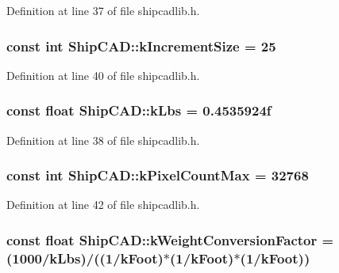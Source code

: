 Definition at line 37 of file shipcadlib.\-h.

\hypertarget{namespaceShipCAD_a1c0de7dc4306d7908bd8c6f7ff69ecdc}{
\subsubsection[{k\-Increment\-Size}]{\setlength{\rightskip}{0pt plus 5cm}const int Ship\-C\-A\-D\-::k\-Increment\-Size = 25}}\label{namespaceShipCAD_a1c0de7dc4306d7908bd8c6f7ff69ecdc}


Definition at line 40 of file shipcadlib.\-h.

\hypertarget{namespaceShipCAD_ad6937518d9742e268b279000d1e7a509}{
\subsubsection[{k\-Lbs}]{\setlength{\rightskip}{0pt plus 5cm}const float Ship\-C\-A\-D\-::k\-Lbs = 0.\-4535924f}}\label{namespaceShipCAD_ad6937518d9742e268b279000d1e7a509}


Definition at line 38 of file shipcadlib.\-h.

\hypertarget{namespaceShipCAD_ac8176e9d12f859826fb131b7febb8c8a}{
\subsubsection[{k\-Pixel\-Count\-Max}]{\setlength{\rightskip}{0pt plus 5cm}const int Ship\-C\-A\-D\-::k\-Pixel\-Count\-Max = 32768}}\label{namespaceShipCAD_ac8176e9d12f859826fb131b7febb8c8a}


Definition at line 42 of file shipcadlib.\-h.

\hypertarget{namespaceShipCAD_aa4319c8e7adfa68048f95c1614984036}{
\subsubsection[{k\-Weight\-Conversion\-Factor}]{\setlength{\rightskip}{0pt plus 5cm}const float Ship\-C\-A\-D\-::k\-Weight\-Conversion\-Factor = (1000/{\bf k\-Lbs})/((1/{\bf k\-Foot})$\ast$(1/{\bf k\-Foot})$\ast$(1/{\bf k\-Foot}))}}\label{namespaceShipCAD_aa4319c8e7adfa68048f95c1614984036}



